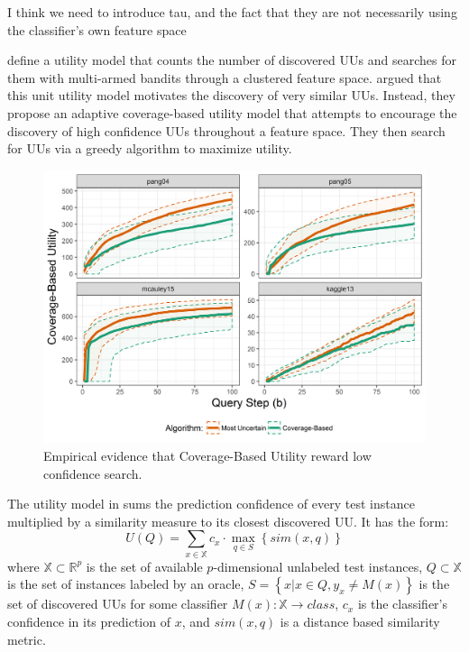 \documentclass[letterpaper]{article} %
\newcommand{\wdb}[1]{{\color{blue} #1}} %
\begin{document}
\wdb{I think we need to introduce tau, and the fact that they are not necessarily using the classifier's own feature space}

\citet{Lakkaraju2016} define a utility model that counts the number of discovered UUs and searches for them with multi-armed bandits through a clustered feature space. \citet{Bansal2018} argued that this unit utility model motivates the discovery of very similar UUs. Instead, they propose an adaptive coverage-based utility model that attempts to encourage the discovery of high confidence UUs throughout a feature space. They then search for UUs via a greedy algorithm to maximize utility.

\begin{figure}[h!]
  \centering
  \includegraphics[width=\textwidth]{../experimentsAndPlots/CoverageVsMostUncertainPlaceholder.png}
  \caption{Empirical evidence that Coverage-Based Utility reward low confidence search.}
  \label{fig:coverutil}
\end{figure}

The utility model in \citet{Bansal2018} sums the prediction confidence of every test instance multiplied by a similarity measure to its closest discovered UU. It has the form: $$U(Q) = \sum_{x \in \mathbb{X}} c_x \cdot \max_{q \in S} \left\{sim\left(x,q \right) \right\}$$ where $\mathbb{X} \subset \mathbb{R}^p$ is the set of available $p$-dimensional unlabeled test instances, $Q \subset \mathbb{X}$ is the set of instances labeled by an oracle, $S = \left\{x|x \in Q, y_x \neq M(x)\right\}$ is the set of discovered UUs for some classifier $M(x):\mathbb{X} \rightarrow class$, $c_x$ is the classifier's confidence in its prediction of $x$, and $sim(x,q)$ is a distance based similarity metric. 
\end{document}
